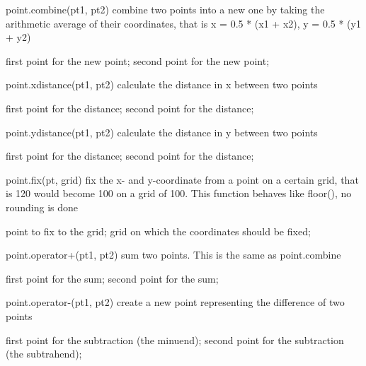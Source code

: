 \begin{APIfunc}{point.combine(pt1, pt2)}
    combine two points into a new one by taking the arithmetic average of their coordinates, that is x = 0.5 * (x1 + x2), y = 0.5 * (y1 + y2)
    \begin{APIparameters}
            first point for the new point;
            second point for the new point;
    \end{APIparameters}
\end{APIfunc}
\begin{APIfunc}{point.xdistance(pt1, pt2)}
    calculate the distance in x between two points
    \begin{APIparameters}
            first point for the distance;
            second point for the distance;
    \end{APIparameters}
\end{APIfunc}
\begin{APIfunc}{point.ydistance(pt1, pt2)}
    calculate the distance in y between two points
    \begin{APIparameters}
            first point for the distance;
            second point for the distance;
    \end{APIparameters}
\end{APIfunc}
\begin{APIfunc}{point.fix(pt, grid)}
    fix the x- and y-coordinate from a point on a certain grid, that is 120 would become 100 on a grid of 100. This function behaves like floor(), no rounding is done
    \begin{APIparameters}
            point to fix to the grid;
            grid on which the coordinates should be fixed;
    \end{APIparameters}
\end{APIfunc}
\begin{APIfunc}{point.operator+(pt1, pt2)}
    sum two points. This is the same as point.combine
    \begin{APIparameters}
            first point for the sum;
            second point for the sum;
    \end{APIparameters}
\end{APIfunc}
\begin{APIfunc}{point.operator-(pt1, pt2)}
    create a new point representing the difference of two points
    \begin{APIparameters}
            first point for the subtraction (the minuend);
            second point for the subtraction (the subtrahend);
    \end{APIparameters}
\end{APIfunc}
